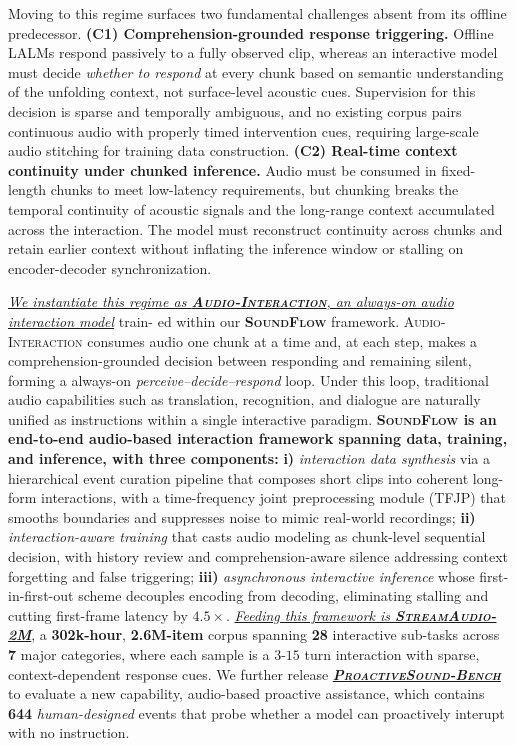 \documentclass{article}
\begin{document}
\vspace{1mm}
Moving to this regime surfaces two fundamental challenges absent from its offline predecessor.
%
\textbf{(C1) Comprehension-grounded response triggering.}
Offline LALMs respond passively to a fully observed clip, whereas an interactive model must decide \emph{whether to respond} at every chunk based on semantic understanding of the unfolding context, not surface-level acoustic cues. Supervision for this decision is sparse and temporally ambiguous, and no existing corpus pairs continuous audio with properly timed intervention cues, requiring large-scale audio stitching for training data construction.
%
\textbf{(C2) Real-time context continuity under chunked inference.}
Audio must be consumed in fixed-length chunks to meet low-latency requirements, but chunking breaks the temporal continuity of acoustic signals and the long-range context accumulated across the interaction. The model must reconstruct continuity across chunks and retain earlier context without inflating the inference window or stalling on encoder-decoder synchronization. 


\vspace{1mm}
\underline{\textit{We instantiate this regime as \textbf{\textsc{Audio-Interaction}}, an always-on audio interaction model}} train- ed within our \textbf{\textsc{SoundFlow}} framework. \textsc{Audio-Interaction} consumes audio one chunk at a time and, at each step, makes a comprehension-grounded decision between responding and remaining silent, forming a always-on \emph{perceive--decide--respond} loop. Under this loop, traditional audio capabilities such as translation, recognition, and dialogue are naturally unified as instructions within a single interactive paradigm. \textbf{\textsc{SoundFlow} is an end-to-end audio-based interaction framework spanning data, training, and inference, with three components:} \textbf{i)} \emph{interaction data synthesis} via a hierarchical event curation pipeline that composes short clips into coherent long-form interactions, with a time-frequency joint preprocessing module (\textsc{TFJP}) that smooths boundaries and suppresses noise to mimic real-world recordings; \textbf{ii)} \emph{interaction-aware training} that casts audio modeling as chunk-level sequential decision, with history review and comprehension-aware silence addressing context forgetting and false triggering; \textbf{iii)} \emph{asynchronous interactive inference} whose first-in-first-out scheme decouples encoding from decoding, eliminating stalling and cutting first-frame latency by $4.5\times$. \underline{\textit{Feeding this framework is \textbf{\textsc{StreamAudio-2M}}}}, a \textbf{302k-hour}, \textbf{2.6M-item} corpus spanning \textbf{28} interactive sub-tasks across \textbf{7} major categories, where each sample is a $3$-$15$ turn interaction with sparse, context-dependent response cues. We further release \underline{\textit{\textbf{\textsc{ProactiveSound-Bench}}}} to evaluate a new capability, audio-based proactive assistance, which contains \textbf{644} \textit{human-designed} events that probe whether a model can proactively interupt with no instruction. 
\end{document}
